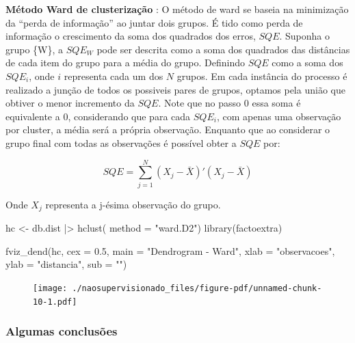 \documentclass[
  letterpaper,
  DIV=11,
  numbers=noendperiod]{scrreprt}
\newenvironment{Shaded}{\begin{snugshade}}{\end{snugshade}}
\newcommand{\AttributeTok}[1]{\textcolor[rgb]{0.40,0.45,0.13}{#1}}
\newcommand{\FloatTok}[1]{\textcolor[rgb]{0.68,0.00,0.00}{#1}}
\newcommand{\FunctionTok}[1]{\textcolor[rgb]{0.28,0.35,0.67}{#1}}
\newcommand{\NormalTok}[1]{\textcolor[rgb]{0.00,0.23,0.31}{#1}}
\newcommand{\OtherTok}[1]{\textcolor[rgb]{0.00,0.23,0.31}{#1}}
\newcommand{\SpecialCharTok}[1]{\textcolor[rgb]{0.37,0.37,0.37}{#1}}
\newcommand{\StringTok}[1]{\textcolor[rgb]{0.13,0.47,0.30}{#1}}
\begin{document}
\textbf{Método Ward de clusterização} : O método de ward se baseia na
minimização da ``perda de informação'' ao juntar dois grupos. É tido
como perda de informação o crescimento da soma dos quadrados dos erros,
\(SQE\). Suponha o grupo \{W\}, a \(SQE_W\) pode ser descrita como a
soma dos quadrados das distâncias de cada item do grupo para a média do
grupo. Definindo \(SQE\) como a soma dos \(SQE_i\), onde \(i\)
representa cada um dos \(N\) grupos. Em cada instância do processo é
realizado a junção de todos os possiveis pares de grupos, optamos pela
união que obtiver o menor incremento da \(SQE\). Note que no passo 0
essa soma é equivalente a 0, considerando que para cada \(SQE_i\), com
apenas uma observação por cluster, a média será a própria observação.
Enquanto que ao considerar o grupo final com todas as observações é
possível obter a \(SQE\) por:

\[
SQE = \sum^N_{j=1}(X_j - \bar{X})'(X_j - \bar{X})
\]

Onde \(X_j\) representa a j-ésima observação do grupo.

\begin{Shaded}
\begin{Highlighting}[]
\NormalTok{hc }\OtherTok{\textless{}{-}}\NormalTok{  db.dist }\SpecialCharTok{|\textgreater{}} 
  \FunctionTok{hclust}\NormalTok{( }\AttributeTok{method =} \StringTok{"ward.D2"}\NormalTok{) }
\FunctionTok{library}\NormalTok{(factoextra)}

\FunctionTok{fviz\_dend}\NormalTok{(hc, }\AttributeTok{cex =} \FloatTok{0.5}\NormalTok{,}
          \AttributeTok{main =} \StringTok{"Dendrogram {-} Ward"}\NormalTok{,}
          \AttributeTok{xlab =} \StringTok{"observacoes"}\NormalTok{, }\AttributeTok{ylab =} \StringTok{"distancia"}\NormalTok{, }\AttributeTok{sub =} \StringTok{""}\NormalTok{)}
\end{Highlighting}
\end{Shaded}

\begin{figure}[H]

{\centering \texttt{[image: ./naosupervisionado\_files/figure-pdf/unnamed-chunk-10-1.pdf]}

}

\end{figure}

\hypertarget{algumas-conclusuxf5es}{%
\subsubsection{Algumas conclusões}\label{algumas-conclusuxf5es}}
\end{document}
